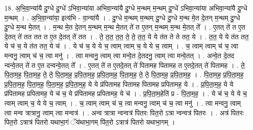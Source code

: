 \documentclass[17pt]{extarticle}
\begin{document}
18. अ॒भि॒वा॒न्या॑यै दु॒ग्धे दु॒ग्धे॑ ऽभिवा॒न्या॑या अभिवा॒न्या॑यै दु॒ग्धे म॒न्थम् म॒न्थम् दु॒ग्धे॑ ऽभिवा॒न्या॑या अभिवा॒न्या॑यै दु॒ग्धे म॒न्थम् । . अ॒भि॒वा॒न्या॑या॒ इत्य॑भि - वा॒न्या॑यै । . दु॒ग्धे म॒न्थम् म॒न्थम् दु॒ग्धे दु॒ग्धे म॒न्थ मे॒त दे॒तन् म॒न्थम् दु॒ग्धे दु॒ग्धे म॒न्थ मे॒तत् । . म॒न्थ मे॒त दे॒तन् म॒न्थम् म॒न्थ मे॒तत् ते॑ त ए॒तन् म॒न्थम् म॒न्थ मे॒तत् ते᳚ । . ए॒तत् ते॑ त ए॒त दे॒तत् ते॑ तत तत त ए॒त दे॒तत् ते॑ तत । . ते॒ त॒त॒ त॒त॒ ते॒ ते॒ त॒त॒ ये ये त॑त ते ते तत॒ ये । . त॒त॒ ये ये त॑त तत॒ ये च॑ च॒ ये त॑त तत॒ ये च॑ । . ये च॑ च॒ ये ये च॒ त्वाम् त्वाम् च॒ ये ये च॒ त्वाम् । . च॒ त्वाम् त्वाम् च॑ च॒ त्वा मन्वनु॒ त्वाम् च॑ च॒ त्वा मनु॑ । . त्वा मन्वनु॒ त्वाम् त्वा मन्वे॒त दे॒तदनु॒ त्वाम् त्वा मन्वे॒तत् । . अन्वे॒त दे॒तद न्वन्वे॒तत् ते॑ त ए॒त दन्वन्वे॒तत् ते᳚ । . ए॒तत् ते॑ त ए॒तदे॒तत् ते॑ पितामह पितामह त ए॒तदे॒तत् ते॑ पितामह । . ते॒ पि॒ता॒म॒ह॒ पि॒ता॒म॒ह॒ ते॒ ते॒ पि॒ता॒म॒ह॒ प्र॒पि॒ता॒म॒ह॒ प्र॒पि॒ता॒म॒ह॒ पि॒ता॒म॒ह॒ ते॒ ते॒ पि॒ता॒म॒ह॒ प्र॒पि॒ता॒म॒ह॒ । . पि॒ता॒म॒ह॒ प्र॒पि॒ता॒म॒ह॒ प्र॒पि॒ता॒म॒ह॒ पि॒ता॒म॒ह॒ पि॒ता॒म॒ह॒ प्र॒पि॒ता॒म॒ह॒ ये ये प्र॑पितामह पितामह पितामह प्रपितामह॒ ये । . प्र॒पि॒ता॒म॒ह॒ ये ये प्र॑पितामह प्रपितामह॒ ये च॑ च॒ ये प्र॑पितामह प्रपितामह॒ ये च॑ । . प्र॒पि॒ता॒म॒हेति॑ प्र - पि॒ता॒म॒ह॒ । . ये च॑ च॒ ये ये च॒ त्वाम् त्वाम् च॒ ये ये च॒ त्वाम् । . च॒ त्वाम् त्वाम् च॑ च॒ त्वा मन्वनु॒ त्वाम् च॑ च॒ त्वा मनु॑ । . त्वा मन्वनु॒ त्वाम् त्वा मन्व त्रात्रानु॒ त्वाम् त्वा मन्वत्र॑ । . अन्व त्रात्रा न्वन्वत्र॑ पितरः पित॒रो ऽत्रा न्वन्वत्र॑ पितरः । . अत्र॑ पितरः पित॒रो ऽत्रात्र॑ पितरो यथाभा॒गं ॅय॑थाभा॒गम् पि॑त॒रो ऽत्रात्र॑ पितरो यथाभा॒गम् । \newline
\end{document}
